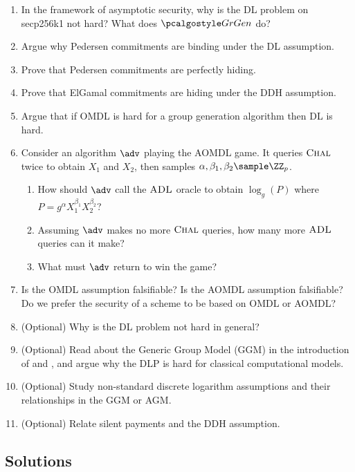 \begin{enumerate}
  \item In the framework of asymptotic security, why is the DL problem on secp256k1 not hard? What does $\grgen$ do?
  \item Argue why Pedersen commitments are binding under the DL assumption.
  \item Prove that Pedersen commitments are perfectly hiding.
  \item Prove that ElGamal commitments are hiding under the DDH assumption.
  \item Argue that if OMDL is hard for a group generation algorithm then DL is hard.
  \item Consider an algorithm $\adv$ playing the AOMDL game. It queries ${\normalfont\textsc{Chal}}$ twice to obtain $X_1$ and $X_2$, then samples $\alpha, \beta_1, \beta_2 \sample \ZZ_p$. 
        \begin{enumerate}
          \item How should $\adv$ call the ${\normalfont\textsc{ADL}}$ oracle to obtain $\log_g(P)$ where $P = g^\alpha X_1^{\beta_1} X_2^{\beta_2}$?
          \item Assuming $\adv$ makes no more ${\normalfont\textsc{Chal}}$ queries, how many more ${\normalfont\textsc{ADL}}$ queries can it make?
          \item What must $\adv$ return to win the game?
        \end{enumerate}
  \item Is the OMDL assumption falsifiable? Is the AOMDL assumption falsifiable? Do we prefer the security of a scheme to be based on OMDL or AOMDL?
  \item (Optional) Why is the DL problem not hard in general?
  \item (Optional) Read about the Generic Group Model (GGM) in the introduction of \textcite{Shoup97} and \textcite{Maurer05}, and argue why the DLP is hard for classical computational models.
  \item (Optional) Study non-standard discrete logarithm assumptions and their relationships in the GGM or AGM.
  \item (Optional) Relate silent payments and the DDH assumption.
\end{enumerate}

\subsection{Solutions}

